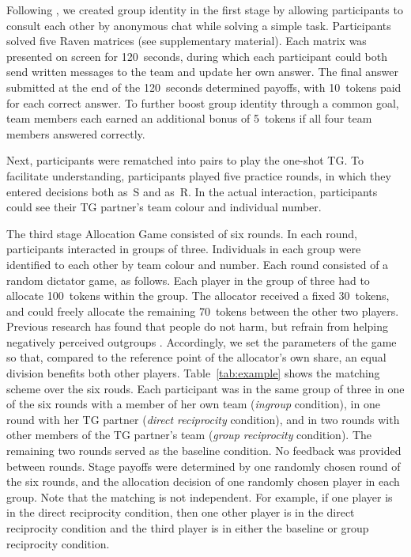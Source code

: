 \documentclass[12pt,a4paper]{article}\usepackage[]{graphicx}\usepackage[]{color}
\begin{document}
Following \citep{chen2009group}, we created group identity in the
first stage by allowing participants to consult each other by anonymous
chat while solving a simple task. Participants solved five Raven matrices
(see supplementary material). Each matrix was presented on screen
for 120~seconds, during which each participant could both send written
messages to the team and update her own answer. The final answer submitted
at the end of the 120~seconds determined payoffs, with 10~tokens
paid for each correct answer. To further boost group identity through
a common goal, team members each earned an additional bonus of 5~tokens
if all four team members answered correctly.

Next, participants were rematched into pairs to play the one-shot
TG. To facilitate understanding, participants played five practice
rounds, in which they entered decisions both as~S and as~R. In the
actual interaction, participants could see their TG partner's team
colour and individual number. 

The third stage Allocation Game consisted of six rounds. In each round, participants interacted
in groups of three. Individuals in each group were identified to each other by
team colour and number. Each round consisted of a random dictator game, as
follows. Each player in the group of three had to allocate 100~tokens within the
group. The allocator received a fixed 30~tokens, and could freely allocate the
remaining 70~tokens between the other two players. Previous research has found that
people do not harm, but refrain from helping negatively perceived outgroups
\citep{weisel2015ingroup}. Accordingly, we set the parameters of the game so
that, compared to the reference point of the allocator's own share, an equal
division benefits both other players. Table~\ref{tab:example} shows the matching scheme over the six rouds. Each participant was in the same group of three in one of the six rounds with a
member of her own team (\emph{ingroup} condition), in one round with her TG partner
(\emph{direct reciprocity} condition), and in two rounds with other members of the TG
partner's team (\emph{group reciprocity} condition). The remaining two rounds
served as the baseline condition. No feedback was provided between rounds. Stage payoffs were determined by one randomly chosen round of the six rounds, and
the allocation decision of one randomly chosen player in each group. Note that the matching is not independent. For example, if one player is in the direct reciprocity condition, then one other player
is in the direct reciprocity condition and the third player is in either the baseline or group
reciprocity condition. 
\end{document}
